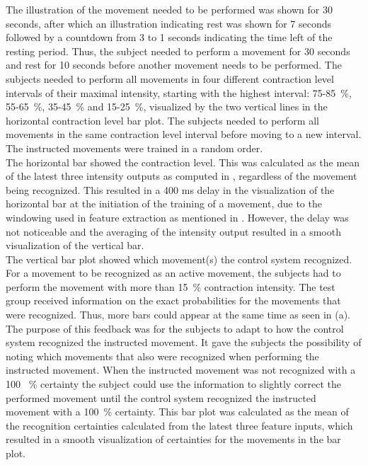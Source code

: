 The illustration of the movement needed to be performed was shown for 30 seconds, after which an illustration indicating rest was shown for 7 seconds followed by a countdown from 3 to 1 seconds indicating the time left of the resting period. Thus, the subject needed to perform a movement for 30 seconds and rest for 10 seconds before another movement needs to be performed. The subjects needed to perform all movements in four different contraction level intervals of their maximal intensity, starting with the highest interval: 75-85~\%, 55-65~\%, 35-45~\% and 15-25~\%, visualized by the two vertical lines in the horizontal contraction level bar plot. The subjects needed to perform all movements in the same contraction level interval before moving to a new interval. The instructed movements were trained in a random order. \\
The horizontal bar showed the contraction level. This was calculated as the mean of the latest three intensity outputs as computed in , regardless of the movement being recognized. This resulted in a 400 ms delay in the visualization of the horizontal bar at the initiation of the training of a movement, due to the windowing used in feature extraction as mentioned in . However, the delay was not noticeable and the averaging of the intensity output resulted in a smooth visualization of the vertical bar. \\
The vertical bar plot showed which movement(s) the control system recognized. For a movement to be recognized as an active movement, the subjects had to perform the movement with more than 15~\% contraction intensity. The test group received information on the exact probabilities for the movements that were recognized. Thus, more bars could appear at the same time as seen in  (a). The purpose of this feedback was for the subjects to adapt to how the control system recognized the instructed movement. It gave the subjects the possibility of noting which movements that also were recognized when performing the instructed movement. When the instructed movement was not recognized with a 100 ~\% certainty the subject could use the information to slightly correct the performed movement until the control system recognized the instructed movement with a 100~\% certainty. This bar plot was calculated as the mean of the recognition certainties calculated from the latest three feature inputs, which resulted in a smooth visualization of certainties for the movements in the bar plot. \\
